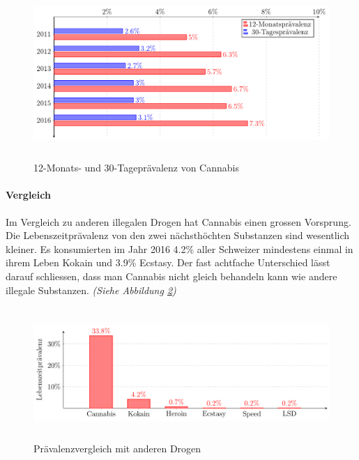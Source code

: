 \documentclass[../main.tex]{subfiles}
\begin{document}
	\noindent	 
	\begin{figure}[H]
		\centering
		\includegraphics[height=6.5cm]{../figures/druguse-shorttime}
		\captionsetup{font=small}
		\caption[12-Monats- und 30-Tageprävalenz von Cannabis]{12-Monats- und 30-Tageprävalenz von Cannabis\protect\footnotemark}	
		\label{fig:kurzzeitpravalenz}	
	\end{figure}
	
	\paragraph{Vergleich}
	Im Vergleich zu anderen illegalen Drogen hat Cannabis einen grossen Vorsprung.
	Die Lebenszeitprävalenz von den zwei nächsthöchten Substanzen sind wesentlich kleiner.
	Es konsumierten im Jahr 2016 4.2\% aller Schweizer mindestens einmal in ihrem Leben Kokain und 3.9\% Ecstasy.
	Der fast achtfache Unterschied lässt darauf schliessen, dass man Cannabis nicht gleich behandeln kann wie andere illegale Substanzen. 
	\textit{(Siehe Abbildung \ref{fig:otherdrugs})}
	
	\noindent
	\begin{figure}[H]
		\centering
		\includegraphics[height=5cm]{../figures/druguse-other}
		\captionsetup{font=small, skip=0pt}
		\caption[Prävalenzvergleich mit anderen Drogen]{Prävalenzvergleich mit anderen Drogen\protect\footnotemark}		
		\label{fig:otherdrugs}
	\end{figure}
	
\end{document}
